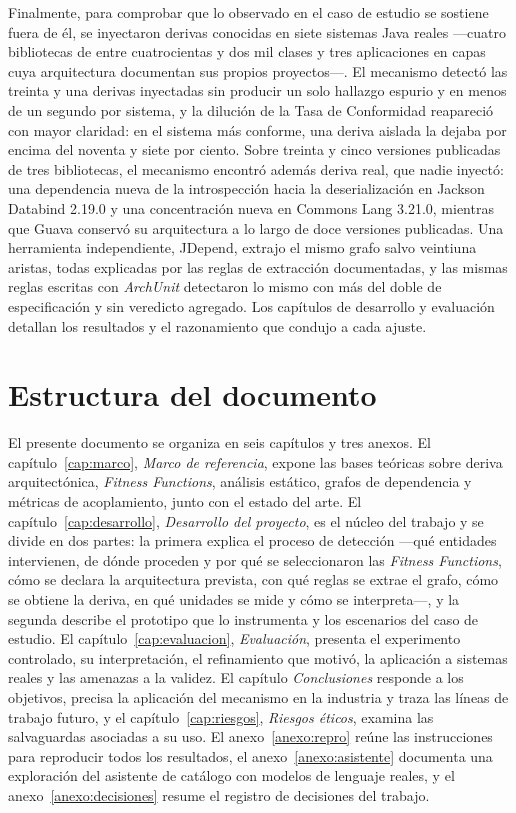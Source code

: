 Finalmente, para comprobar que lo observado en el caso de estudio se sostiene fuera de él, se inyectaron derivas conocidas en siete sistemas Java reales ---cuatro bibliotecas de entre cuatrocientas y dos mil clases y tres aplicaciones en capas cuya arquitectura documentan sus propios proyectos---. El mecanismo detectó las treinta y una derivas inyectadas sin producir un solo hallazgo espurio y en menos de un segundo por sistema, y la dilución de la Tasa de Conformidad reapareció con mayor claridad: en el sistema más conforme, una deriva aislada la dejaba por encima del noventa y siete por ciento. Sobre treinta y cinco versiones publicadas de tres bibliotecas, el mecanismo encontró además deriva real, que nadie inyectó: una dependencia nueva de la introspección hacia la deserialización en Jackson Databind 2.19.0 y una concentración nueva en Commons Lang 3.21.0, mientras que Guava conservó su arquitectura a lo largo de doce versiones publicadas. Una herramienta independiente, JDepend, extrajo el mismo grafo salvo veintiuna aristas, todas explicadas por las reglas de extracción documentadas, y las mismas reglas escritas con \textit{ArchUnit} detectaron lo mismo con más del doble de especificación y sin veredicto agregado. Los capítulos de desarrollo y evaluación detallan los resultados y el razonamiento que condujo a cada ajuste.

\section{Estructura del documento}
El presente documento se organiza en seis capítulos y tres anexos. El capítulo~\ref{cap:marco}, \textit{Marco de referencia}, expone las bases teóricas sobre deriva arquitectónica, \textit{Fitness Functions}, análisis estático, grafos de dependencia y métricas de acoplamiento, junto con el estado del arte. El capítulo~\ref{cap:desarrollo}, \textit{Desarrollo del proyecto}, es el núcleo del trabajo y se divide en dos partes: la primera explica el proceso de detección ---qué entidades intervienen, de dónde proceden y por qué se seleccionaron las \textit{Fitness Functions}, cómo se declara la arquitectura prevista, con qué reglas se extrae el grafo, cómo se obtiene la deriva, en qué unidades se mide y cómo se interpreta---, y la segunda describe el prototipo que lo instrumenta y los escenarios del caso de estudio. El capítulo~\ref{cap:evaluacion}, \textit{Evaluación}, presenta el experimento controlado, su interpretación, el refinamiento que motivó, la aplicación a sistemas reales y las amenazas a la validez. El capítulo \textit{Conclusiones} responde a los objetivos, precisa la aplicación del mecanismo en la industria y traza las líneas de trabajo futuro, y el capítulo~\ref{cap:riesgos}, \textit{Riesgos éticos}, examina las salvaguardas asociadas a su uso. El anexo~\ref{anexo:repro} reúne las instrucciones para reproducir todos los resultados, el anexo~\ref{anexo:asistente} documenta una exploración del asistente de catálogo con modelos de lenguaje reales, y el anexo~\ref{anexo:decisiones} resume el registro de decisiones del trabajo.